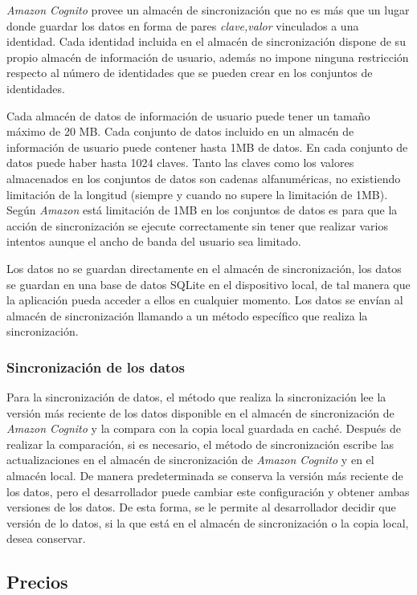 \documentclass{article}
\begin{document}
	\emph{Amazon Cognito} provee un almacén de sincronización que no es más que un lugar donde guardar los datos en forma de pares \emph{clave,valor} vinculados a una identidad. Cada identidad incluida en el almacén de sincronización dispone de su propio almacén de información de usuario, además no impone ninguna restricción respecto al número de identidades que se pueden crear en los conjuntos de identidades. 
	
	Cada almacén de datos de información de usuario puede tener un tamaño máximo de 20 MB. Cada conjunto de datos incluido en un almacén de información de usuario puede contener hasta 1MB de datos. En cada conjunto de datos puede haber hasta 1024 claves. Tanto las claves como los valores almacenados en los conjuntos de datos son cadenas alfanuméricas, no existiendo limitación de la longitud (siempre y cuando no supere la limitación de 1MB). Según \emph{Amazon} está limitación de 1MB en los conjuntos de datos es para que la acción de sincronización se ejecute correctamente sin tener que realizar varios intentos aunque el ancho de banda del usuario sea limitado.
	
	Los datos no se guardan directamente en el almacén de sincronización, los datos se guardan en una base de datos SQLite en el dispositivo local, de tal manera que la aplicación pueda acceder a ellos en cualquier momento. Los datos se envían al almacén de sincronización llamando a un método específico que realiza la sincronización. 

\subsubsection{Sincronización de los datos}

	Para la sincronización de datos, el método que realiza la sincronización  lee la versión más reciente de los datos disponible en el almacén de sincronización de \emph{Amazon Cognito} y la compara con la copia local guardada en caché. Después de realizar la comparación, si es necesario, el método de sincronización escribe las actualizaciones en el almacén de sincronización de \emph{Amazon Cognito} y en el almacén local. De manera predeterminada se conserva la versión más reciente de los datos, pero el desarrollador puede cambiar este configuración y obtener ambas versiones de los datos. De esta forma, se le permite al desarrollador decidir que versión de lo datos, si la que está en el almacén de sincronización o la copia local, desea conservar.

\subsection{Precios}
\end{document}
